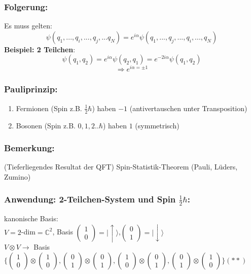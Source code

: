 \documentclass[twoside,a4paper]{scrartcl}
\newcommand{\C}{\mathbb{C}}
\renewcommand{\1}{\mathds{1}}
\newcommand{\Ra}{\Rightarrow}
\newcommand{\ra}{\rightarrow}
\renewcommand{\C}{\mathbb{C}}
\begin{document}
\subsubsection*{Folgerung:}
Es muss gelten: $$\psi(q_1,...,q_i,...,q_j,...q_N)=e^{i\alpha} \psi(q_1,...,q_j,...,q_i,...,q_N)$$
\textbf{Beispiel: 2 Teilchen}:
$$\psi(q_1,q_2)=e^{i\alpha}\psi(q_2,q_1)=e^{-2i\alpha} \psi(q_1,q_2)$$
$$\Ra e^{i\alpha=\pm 1}$$
\subsubsection*{Pauliprinzip:}
\begin{enumerate}
\item Fermionen (Spin z.B. $\frac{1}{2}\hbar$) haben $-1$ (antivertauschen unter Transposition)
\item Bosonen (Spin z.B. $0,1,2..\hbar$) haben $1$ (symmetrisch)
\end{enumerate}
\subsubsection*{Bemerkung:}
(Tieferliegendes Resultat der QFT) Spin-Statistik-Theorem (Pauli, Lüders, Zumino)

\subsubsection*{Anwendung: 2-Teilchen-System und Spin $\frac{1}{2}\hbar$:}
kanonische Basis:\\
$V=2$-dim$=\C^2$, Basis $\begin{pmatrix}1 \\ 0 \end{pmatrix}=|\uparrow\rangle$,$\begin{pmatrix}0 \\ 1 \end{pmatrix}=|\downarrow\rangle$\\
$V\otimes V \ra$ Basis $\{\begin{pmatrix}1 \\ 0 \end{pmatrix} \otimes \begin{pmatrix}1 \\ 0 \end{pmatrix}, \begin{pmatrix}0 \\ 1 \end{pmatrix} \otimes \begin{pmatrix}0 \\ 1 \end{pmatrix}, \begin{pmatrix}1 \\ 0 \end{pmatrix} \otimes \begin{pmatrix}0 \\ 1 \end{pmatrix}, \begin{pmatrix}0 \\ 1 \end{pmatrix} \otimes \begin{pmatrix}1 \\ 0 \end{pmatrix} \} (**)$
\end{document}
